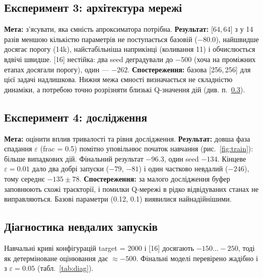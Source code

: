 \documentclass[11pt,a4paper]{article}
\begin{document}
\subsection{Експеримент 3: архітектура мережі}
\textbf{Мета:} з'ясувати, яка ємність апроксиматора потрібна. \textbf{Результат:} [64,\,64] з у 14 разів меншою кількістю параметрів не поступається базовій ($-80.0$), найшвидше досягає порогу (14k), найстабільніша наприкінці (коливання 11) і обчислюється вдвічі швидше. [16] нестійка: два seed деградували до $-500$ (хоча на проміжних етапах досягали порогу), один — $-262$. \textbf{Спостереження:} базова [256,\,256] для цієї задачі надлишкова. Нижня межа ємності визначається не складністю динаміки, а потребою точно розрізняти близькі Q-значення дій (див. п.~\ref{sec:diag}).

\subsection{Експеримент 4: дослідження}
\textbf{Мета:} оцінити вплив тривалості та рівня дослідження. \textbf{Результат:} довша фаза спадання $\varepsilon$ (frac = 0.5) помітно уповільнює початок навчання (рис.~\ref{fig:train}): більше випадкових дій. Фінальний результат $-96.3$, один seed $-134$. Кінцеве $\varepsilon=0.01$ дало два добрі запуски ($-79$, $-81$) і один частково невдалий ($-246$), тому середнє $-135\pm78$. \textbf{Спостереження:} за малого дослідження буфер заповнюють схожі траєкторії, і помилки Q-мережі в рідко відвідуваних станах не виправляються. Базові параметри (0.12, 0.1) виявилися найнадійнішими.

\subsection{Діагностика невдалих запусків}\label{sec:diag}
Навчальні криві конфігурацій target = 2000 і [16] досягають $-150\ldots-250$, тоді як детерміноване оцінювання дає $\approx-500$. Фінальні моделі перевірено жадібно і з $\varepsilon=0.05$ (табл.~\ref{tab:diag}).
\end{document}
